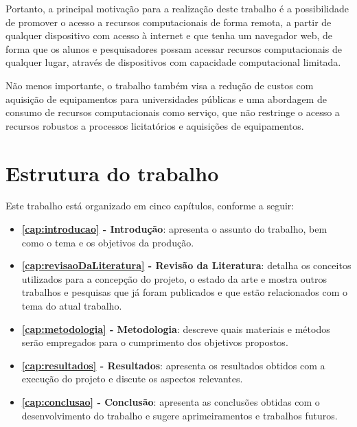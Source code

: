 Portanto, a principal motivação para a realização deste trabalho é a possibilidade de promover o
acesso a recursos computacionais de forma remota, a partir de qualquer dispositivo com acesso à
internet e que tenha um navegador web, de forma que os alunos e pesquisadores possam acessar
recursos computacionais de qualquer lugar, através de dispositivos com capacidade computacional
limitada.

Não menos importante, o trabalho também visa a redução de custos com aquisição de equipamentos para
universidades públicas e uma abordagem de consumo de recursos computacionais como serviço, que
não restringe o acesso a recursos robustos a processos licitatórios e aquisições de equipamentos.


\section{Estrutura do trabalho}
\label{sec:estruturaTrabalho}

Este trabalho está organizado em cinco capítulos, conforme a seguir:

\begin{itemize}
    \item \textbf{\autoref{cap:introducao} - Introdução}: apresenta o assunto do trabalho, bem como o tema e os objetivos da produção.

    \item \textbf{\autoref{cap:revisaoDaLiteratura} - Revisão da Literatura}: detalha os conceitos utilizados para a concepção do projeto, o estado da arte e mostra outros trabalhos e pesquisas que já foram publicados e que estão relacionados com o tema do atual trabalho.

    \item \textbf{\autoref{cap:metodologia} - Metodologia}: descreve quais materiais e métodos serão empregados para o cumprimento dos objetivos propostos.

    \item \textbf{\autoref{cap:resultados} - Resultados}: apresenta os resultados obtidos com a execução do projeto e discute os aspectos relevantes.

    \item \textbf{\autoref{cap:conclusao} - Conclusão}: apresenta as conclusões obtidas com o desenvolvimento do trabalho e sugere aprimeiramentos e trabalhos futuros.
\end{itemize}
